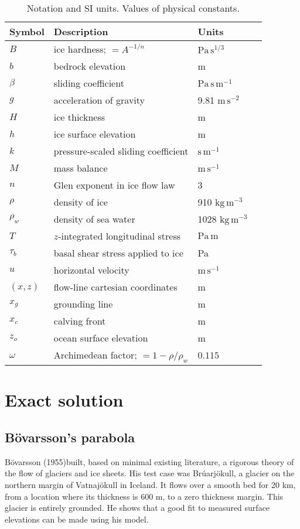 \documentclass[review,letterpaper]{igs}
\renewcommand{\dh}{\fontencoding{T1}\selectfont{\symbol{240}}}
\newcommand{\bod}{B\"o\dh varsson\xspace}
\newcommand{\citebod}{B\"o\dh varsson (1955)\nocite{Bodvardsson}}
\begin{document}
\begin{table}
\caption{Notation and SI units.  Values of physical constants.}\label{tab:notation}

\medskip
\begin{tabular}{llll}
Symbol & Description & Units \\ \hline
$B$ & ice hardness; $=A^{-1/n}$ & $\text{Pa}\,\text{s}^{1/3}$  \\
$b$ & bedrock elevation & m \\
$\beta$ & sliding coefficient & $\text{Pa}\,\text{s}\,\text{m}^{-1}$ \\
$g$ & acceleration of gravity  & 9.81 $\text{m}\,\text{s}^{-2}$\\
$H$ & ice thickness & m \\
$h$ & ice surface elevation & m \\
$k$ & pressure-scaled sliding coefficient  & $\text{s}\,\text{m}^{-1}$ \\
$M$ & mass balance & $\text{m}\,\text{s}^{-1}$ \\
$n$ & Glen exponent in ice flow law & 3 \\
$\rho$ & density of ice & 910 $\text{kg}\,\text{m}^{-3}$ \\
$\rho_w$ & density of sea water & 1028 $\text{kg}\,\text{m}^{-3}$ \\
$T$ & $z$-integrated longitudinal stress & $\text{Pa}\,\text{m}$ \\
$\tau_{b}$ & basal shear stress applied to ice & Pa \\
$u$ & horizontal velocity & $\text{m}\,\text{s}^{-1}$ \\
$(x,z)$ & flow-line cartesian coordinates & m  \\
$x_g$ & grounding line & m  \\
$x_c$ & calving front & m  \\
$z_o$ & ocean surface elevation & m \\
$\omega$ & Archimedean factor; $=1 - \rho/\rho_w$ & $0.115$
\end{tabular}
\end{table}


\section{Exact solution}

\subsection*{\bod's parabola}  \citebod built, based on minimal existing literature, a rigorous theory of the flow of glaciers and ice sheets.  His test case was Br\'uarj\"okull, a glacier on the northern margin of Vatnaj\"okull in Iceland.  It flows over a smooth bed for 20 km, from a location where its thickness is 600 m, to a zero thickness margin.  This glacier is entirely grounded.  He shows that a good fit to measured surface elevations can be made using his model.
\end{document}
